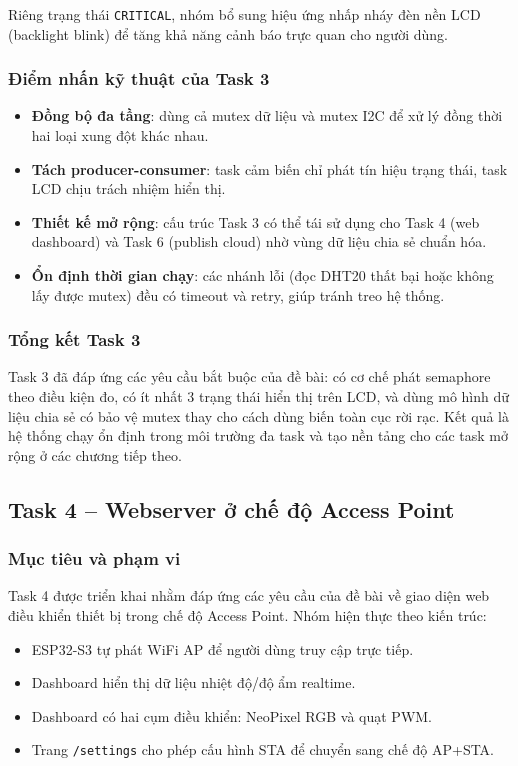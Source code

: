 Riêng trạng thái \texttt{CRITICAL}, nhóm bổ sung hiệu ứng nhấp nháy đèn nền LCD (backlight blink) để tăng khả năng cảnh báo trực quan cho người dùng.

\subsubsection*{Điểm nhấn kỹ thuật của Task 3}

\begin{itemize}
    \item \textbf{Đồng bộ đa tầng}: dùng cả mutex dữ liệu và mutex I2C để xử lý đồng thời hai loại xung đột khác nhau.
    \item \textbf{Tách producer-consumer}: task cảm biến chỉ phát tín hiệu trạng thái, task LCD chịu trách nhiệm hiển thị.
    \item \textbf{Thiết kế mở rộng}: cấu trúc Task 3 có thể tái sử dụng cho Task 4 (web dashboard) và Task 6 (publish cloud) nhờ vùng dữ liệu chia sẻ chuẩn hóa.
    \item \textbf{Ổn định thời gian chạy}: các nhánh lỗi (đọc DHT20 thất bại hoặc không lấy được mutex) đều có timeout và retry, giúp tránh treo hệ thống.
\end{itemize}

\subsubsection*{Tổng kết Task 3}

Task 3 đã đáp ứng các yêu cầu bắt buộc của đề bài: có cơ chế phát semaphore theo điều kiện đo, có ít nhất 3 trạng thái hiển thị trên LCD, và dùng mô hình dữ liệu chia sẻ có bảo vệ mutex thay cho cách dùng biến toàn cục rời rạc. Kết quả là hệ thống chạy ổn định trong môi trường đa task và tạo nền tảng cho các task mở rộng ở các chương tiếp theo.

\subsection{Task 4 -- Webserver ở chế độ Access Point}

\subsubsection*{Mục tiêu và phạm vi}

Task 4 được triển khai nhằm đáp ứng các yêu cầu của đề bài về giao diện web điều khiển thiết bị trong chế độ Access Point. Nhóm hiện thực theo kiến trúc:
\begin{itemize}
    \item ESP32-S3 tự phát WiFi AP để người dùng truy cập trực tiếp.
    \item Dashboard hiển thị dữ liệu nhiệt độ/độ ẩm realtime.
    \item Dashboard có hai cụm điều khiển: NeoPixel RGB và quạt PWM.
    \item Trang \texttt{/settings} cho phép cấu hình STA để chuyển sang chế độ AP+STA.
\end{itemize}

